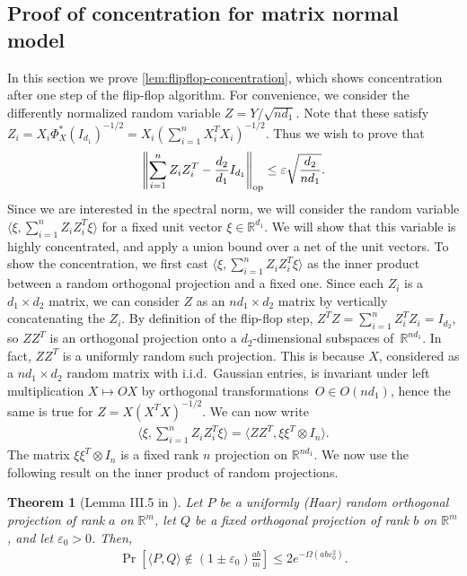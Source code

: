 \documentclass[aos]{imsart}
\newtheorem{theorem}{Theorem}[section]
\theoremstyle{definition}
\numberwithin{equation}{section}
\DeclareMathOperator{\op}{op}
\DeclarePairedDelimiter{\norm}{\lVert}{\rVert}
\newcommand{\R}{{\mathbb{R}}}
\newcommand{\ot}{\otimes}
\newcommand{\eps}{\varepsilon}
\begin{document}
\begin{appendix}
\section{Proof of concentration for matrix normal model}\label{app:flipflop-concentration}
In this section we prove \cref{lem:flipflop-concentration}, which shows concentration after one step of the flip-flop algorithm.
For convenience, we consider the differently normalized random variable $Z = Y/\sqrt{nd_1}$.
Note that these satisfy
$Z_i = X_i \Phi_X^*(I_{d_1})^{-1/2} =  X_i (\sum_{i = 1}^n X_i^T X_i)^{-1/2}.$
Thus we wish to prove that
\begin{align}\label{eq:1marg goal}
  \norm*{\sum_{i=1}^n Z_i Z_i^T - \frac{d_2}{d_1} I_{d_1}}_{\op}
\leq \eps \sqrt{\frac{d_2}{nd_1}}.
\end{align}
Since we are interested in the spectral norm, we will consider the random variable $\langle \xi, \sum_{i = 1}^n Z_i Z_i^{T} \xi \rangle$ for a fixed unit vector $\xi \in \R^{d_1}$.
We will show that this variable is highly concentrated, and apply a union bound over a net of the unit vectors.
To show the concentration, we first cast $\langle \xi, \sum_{i = 1}^n Z_i Z_i^{T} \xi \rangle$ as the inner product between a random orthogonal projection and a fixed one.
Since each $Z_i$ is a $d_1 \times d_2$ matrix, we can consider $Z$ as an $n d_1 \times d_2$ matrix by vertically concatenating the $Z_i$.
By definition of the flip-flop step, $Z^T Z = \sum_{i=1}^n Z_i^T Z_i = I_{d_2}$, so $Z Z^T$ is an orthogonal projection onto a $d_2$-dimensional subspaces of~$\R^{n d_1}$.
In fact, $Z Z^T$ is a uniformly random such projection.
This is because $X$, considered as a $n d_1 \times d_2$ random matrix with i.i.d.\ Gaussian entries, is invariant under left multiplication $X \mapsto OX$ by orthogonal transformations~$O \in O(n d_1)$, hence the same is true for $Z = X (X^T X)^{-1/2}$.
We can now write
\begin{align*}
  \langle \xi,  \sum_{i = 1}^n Z_i Z_i^{T} \xi \rangle = \langle Z Z^T,  \xi \xi^T \ot I_{n} \rangle.
\end{align*}
The matrix $\xi \xi^T \otimes I_{n}$ is a fixed rank $n$ projection on $\R^{n d_1}$.
We now use the following result on the inner product of random projections.

\begin{theorem} [Lemma III.5 in \cite{hayden2006aspects}]
Let $P$ be a uniformly (Haar) random orthogonal projection of rank $a$ on $\R^{m}$, let $Q$ be a fixed orthogonal projection of rank $b$ on $\R^{m}$, and let $\eps_0>0$.
Then,
\begin{align*}
\Pr \left[ \langle P, Q \rangle \not\in (1 \pm \eps_0) \frac{ab}{m} \right] \leq 2 e^{ - \Omega( ab \eps_0^2 ) }.
\end{align*}
\end{theorem}


\end{appendix}
\end{document}
